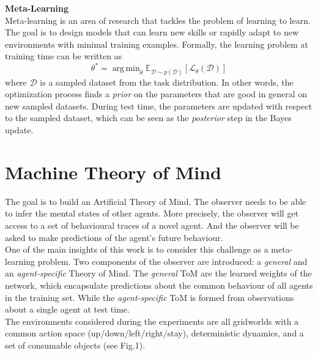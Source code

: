 \documentclass[twocolumn,superscriptaddress,aps]{revtex4-1}
\DeclareMathOperator*{\argmin}{arg\,min}
\begin{document}
\noindent \textbf{Meta-Learning} \\[0.15cm]
Meta-learning \cite{Schmidhuber} is an area of research that tackles the problem of learning to learn. The goal is to design models that can learn new skills or rapidly adapt to new environments with minimal training examples. Formally, the learning problem at training time can be written as
\begin{equation}
\theta^* = \argmin_\theta \mathbb{E}_{\mathcal{D} \sim p(\mathcal{D})}[\mathcal{L}_\theta(\mathcal{D})]
\label{eq:meta}
\end{equation}
where $\mathcal{D}$ is a sampled dataset from the task distribution. In other words, the optimization process finds a \textit{prior} on the parameters that are good in general on new sampled datasets. During test time, the parameters are updated with respect to the sampled dataset, which can be seen as the \textit{posterior} step in the Bayes update.

\section{Machine Theory of Mind}\label{sec:machinetom}
The goal is to build an Artificial Theory of Mind. The observer needs to be able to infer the mental states of other agents. More precisely, the observer will get access to a set of behavioural traces of a novel agent. And the observer will be asked to make predictions of the agent's future behaviour. \\

One of the main insights of this work is to consider this challenge as a meta-learning problem. Two components of the observer are introduced: a \textit{general} and an \textit{agent-specific} Theory of Mind. The \textit{general} ToM are the learned weights of the network, which encapsulate predictions about the common behaviour of all agents in the training set. While the \textit{agent-specific} ToM is formed from observations about a single agent at test time. \\

The environments considered during the experiments are all gridworlds with a common action space (up/down/left/right/stay), deterministic dynamics, and a set of consumable objects (see Fig.1).\\
\end{document}
